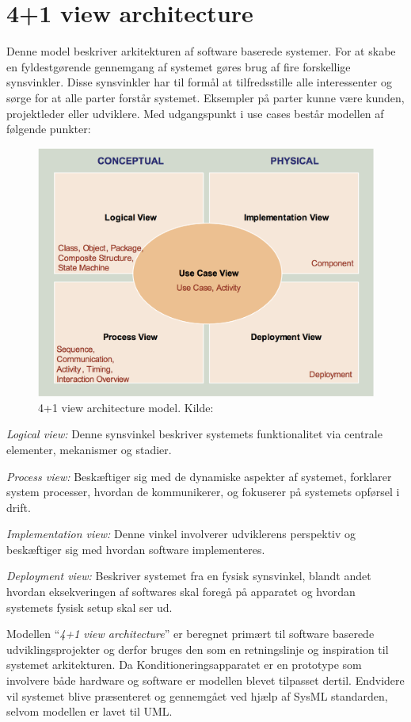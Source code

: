 \section{4+1 view architecture} \label{title:viewArc}
Denne model beskriver arkitekturen af software baserede systemer. For at skabe en fyldestgørende gennemgang af systemet gøres brug af fire forskellige synsvinkler. Disse synsvinkler har til formål at  tilfredsstille alle interessenter og sørge for at alle parter forstår systemet. Eksempler på parter kunne være kunden, projektleder eller udviklere. Med udgangspunkt i use cases består modellen af følgende punkter: 

\begin{figure}[H]
	\includegraphics[width=\textwidth]{SystemArkitektur/filer/4plus1model.png}
	\caption{4+1 view architecture model. Kilde: \cite{RefWorks:10}}\label{fig:4plus1model}
\end{figure}

\textit{Logical view:} Denne synsvinkel beskriver systemets funktionalitet via centrale elementer, mekanismer og stadier.

\textit{Process view:} Beskæftiger sig med de dynamiske aspekter af systemet, forklarer system processer, hvordan de kommunikerer, og fokuserer på systemets opførsel i drift.

\textit{Implementation view:} Denne vinkel involverer udviklerens perspektiv og beskæftiger sig med hvordan software implementeres.

\textit{Deployment view:} Beskriver systemet fra en fysisk synsvinkel, blandt andet hvordan eksekveringen af softwares skal foregå på apparatet og hvordan systemets fysisk setup skal ser ud. 

Modellen “\textit{4+1 view architecture}” er beregnet primært til software baserede udviklingsprojekter og derfor bruges den som en retningslinje og inspiration til systemet arkitekturen. Da Konditioneringsapparatet er en prototype som involvere både hardware og software er modellen blevet tilpasset dertil. Endvidere vil systemet blive præsenteret og gennemgået ved hjælp af SysML standarden, selvom modellen er lavet til UML.


